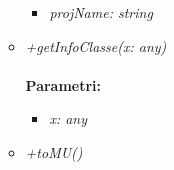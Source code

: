 \begin{itemize}
\begin{itemize}
\begin{itemize}
    			\item \emph{projName: string}\\
    			
    		\end{itemize}
    		\item \emph{+getInfoClasse(x: any)}\\
    		\\
    		\textbf{Parametri:}
    		\begin{itemize}
    			\item \emph{x: any}\\
    			
    		\end{itemize}
    		\item \emph{+toMU()}\\
    		
		\end{itemize}
\end{itemize}